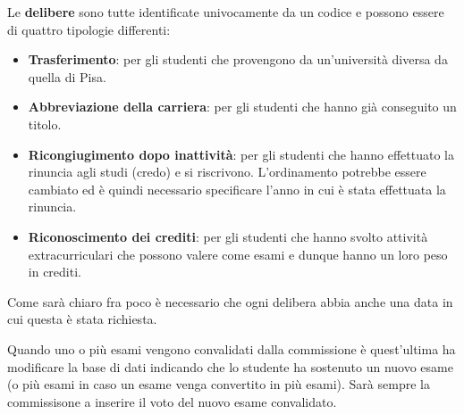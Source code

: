 Le \textbf{delibere} sono tutte identificate univocamente da un
codice e possono essere di quattro tipologie differenti:
\begin{itemize}
	\item \textbf{Trasferimento}: per gli studenti che
	      provengono da un'università diversa da quella di Pisa.
	\item \textbf{Abbreviazione della carriera}: per gli
	      studenti che hanno già conseguito un titolo.
	\item \textbf{Ricongiugimento dopo inattività}: per gli
	      studenti che hanno effettuato la rinuncia agli studi
	      (credo) e si riscrivono. L'ordinamento potrebbe essere
	      cambiato ed è quindi necessario specificare l'anno in
	      cui è stata effettuata la rinuncia.
	\item \textbf{Riconoscimento dei crediti}: per gli studenti
	      che hanno svolto attività extracurriculari che possono
	      valere come esami e dunque hanno un loro peso in
	      crediti.
\end{itemize}
Come sarà chiaro fra poco è necessario che ogni delibera abbia
anche una data in cui questa è stata richiesta.

Quando uno o più esami vengono convalidati dalla commissione
è quest'ultima ha modificare la base di dati indicando che lo
studente ha sostenuto un nuovo esame (o più esami in caso un
esame venga convertito in più esami). Sarà sempre la
commissisone a inserire il voto del nuovo esame convalidato.

